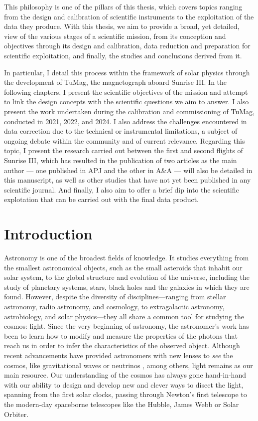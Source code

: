This philosophy is one of the pillars of this thesis, which covers topics ranging from the design and calibration of scientific instruments to the exploitation of the data they produce. With this thesis, we aim to provide a broad, yet detailed, view of the various stages of a scientific mission, from its conception and objectives through its design and calibration, data reduction and preparation for scientific exploitation, and finally, the studies and conclusions derived from it.

In particular, I detail this process within the framework of solar physics through the development of TuMag, the magnetograph aboard Sunrise III. In the following chapters, I present the scientific objectives of the mission and attempt to link the design concepts with the scientific questions we aim to answer. I also present the work undertaken during the calibration and commissioning of TuMag, conducted in 2021, 2022, and 2024. I also address the challenges encountered in data correction due to the technical or instrumental limitations, a subject of ongoing debate within the community and of current relevance. Regarding this topic, I present the research carried out between the first and second flights of Sunrise III, which has resulted in the publication of two articles as the main author — one published in APJ and the other in A\&A — will also be detailed in this manuscript, as well as other studies that have not yet been published in any scientific journal. And finally, I also aim to offer a brief dip into the scientific explotation that can be carried out with the final data product. 

\section{Introduction}

Astronomy is one of the broadest fields of knowledge. It studies everything from the smallest astronomical objects, such as the small asteroids that inhabit our solar system, to the global structure and evolution of the universe, including the study of planetary systems, stars, black holes and the galaxies in which they are found. However, despite the diversity of disciplines—ranging from stellar astronomy, radio astronomy, and cosmology, to extragalactic astronomy, astrobiology, and solar physics—they all share a common tool for studying the cosmos: light. Since the very beginning of astronomy, the astronomer's work has been to learn how to modify and measure the properties of the photons that reach us in order to infer the characteristics of the observed object. Although recent advancements have provided astronomers with new lenses to \textit{see} the cosmos, like gravitational waves \citep{gravitational_waves} or neutrinos \citep{neutrinos}, among others, light remains as our main resource. Our understanding of the cosmos has always gone hand-in-hand with our ability to design and develop new and clever ways to disect the light, spanning from the first solar clocks, passing through Newton's first telescope to the modern-day spaceborne telescopes like the Hubble, James Webb or Solar Orbiter. 

